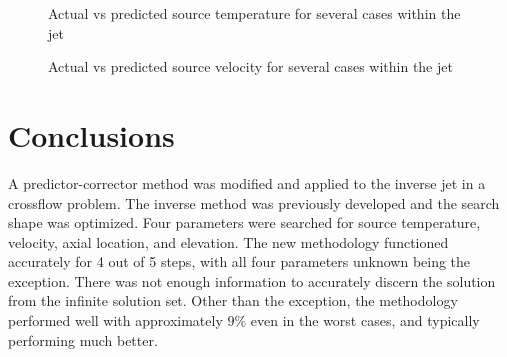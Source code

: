 \documentclass[preprint,12pt]{elsarticle}
\begin{document}
\begin{figure}[!h!t!b!p]
\begin{center}
\caption{Actual vs predicted source temperature for several cases within the jet}
\label{fig:typejetEUTXEE}
\end{center}
\end{figure}
\begin{figure}[!h!t!b!p]
\begin{center}
\caption{Actual vs predicted source velocity for several cases within the jet}
\label{fig:typejetEXTUEE}
\end{center}
\end{figure}
\section{Conclusions}
A predictor-corrector method was modified and applied to the inverse jet in a crossflow problem.  The inverse method was previously developed and the search shape was optimized.  Four parameters were searched for source temperature, velocity, axial location, and elevation.  The new methodology functioned accurately for 4 out of 5 steps, with all four parameters unknown being the exception.  There was not enough information to accurately discern the solution from the infinite solution set.  Other than the exception, the methodology performed well with approximately $9\%$ even in the worst cases, and typically performing much better.
\end{document}
